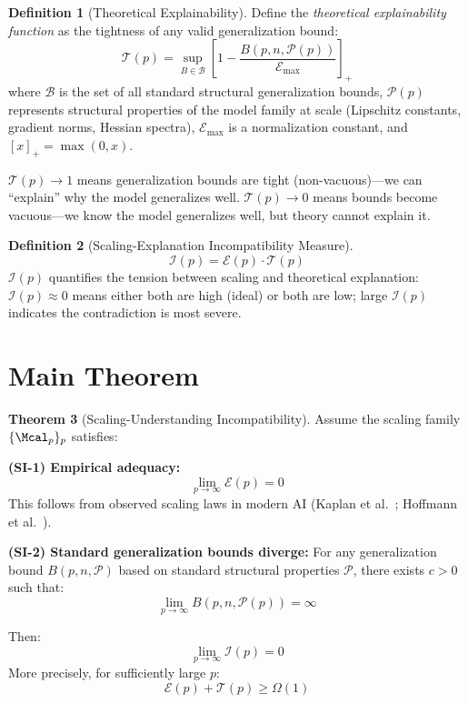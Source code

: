 \documentclass[12pt]{article}
\newcommand{\B}{\mathcal{B}}
\newcommand{\Pcal}{\mathcal{P}}
\theoremstyle{definition}
\newtheorem{definition}{Definition}[section]
\newtheorem{theorem}[definition]{Theorem}
\theoremstyle{remark}
\begin{document}
\begin{definition}[Theoretical Explainability]\label{def:theoretical}
Define the \emph{theoretical explainability function} as the tightness of any valid generalization bound:
\begin{equation}
\mathcal{T}(p) = \sup_{B \in \B} \left[ 1 - \frac{B(p, n, \Pcal(p))}{\mathcal{E}_{\max}} \right]_+
\end{equation}
where $\B$ is the set of all standard structural generalization bounds, $\Pcal(p)$ represents structural properties of the model family at scale (Lipschitz constants, gradient norms, Hessian spectra), $\mathcal{E}_{\max}$ is a normalization constant, and $[x]_+ = \max(0, x)$.

$\mathcal{T}(p) \to 1$ means generalization bounds are tight (non-vacuous)---we can ``explain'' why the model generalizes well. $\mathcal{T}(p) \to 0$ means bounds become vacuous---we know the model generalizes well, but theory cannot explain it.
\end{definition}

\begin{definition}[Scaling-Explanation Incompatibility Measure]
\begin{equation}
\mathcal{I}(p) = \mathcal{E}(p) \cdot \mathcal{T}(p)
\end{equation}
$\mathcal{I}(p)$ quantifies the tension between scaling and theoretical explanation: $\mathcal{I}(p) \approx 0$ means either both are high (ideal) or both are low; large $\mathcal{I}(p)$ indicates the contradiction is most severe.
\end{definition}

\section{Main Theorem}

\begin{theorem}[Scaling-Understanding Incompatibility]\label{thm:main}
Assume the scaling family $\{\Mcal_p\}_p$ satisfies:

\textbf{(SI-1) Empirical adequacy:}
\begin{equation}
\lim_{p \to \infty} \mathcal{E}(p) = 0
\end{equation}
This follows from observed scaling laws in modern AI (Kaplan et al.~\cite{kaplan2020scaling}; Hoffmann et al.~\cite{hoffmann2022training}).

\textbf{(SI-2) Standard generalization bounds diverge:}
For any generalization bound $B(p, n, \Pcal)$ based on standard structural properties $\Pcal$, there exists $c > 0$ such that:
\begin{equation}
\lim_{p \to \infty} B(p, n, \Pcal(p)) = \infty
\end{equation}

Then:
\begin{equation}
\lim_{p \to \infty} \mathcal{I}(p) = 0
\end{equation}
More precisely, for sufficiently large $p$:
\begin{equation}
\mathcal{E}(p) + \mathcal{T}(p) \geq \Omega(1)
\end{equation}
\end{theorem}
\end{document}
